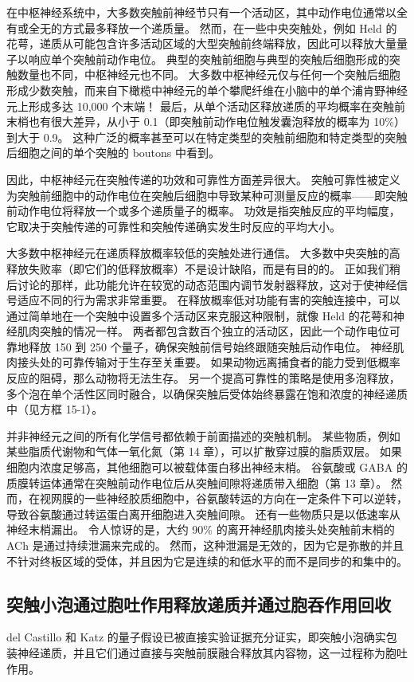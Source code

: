 在中枢神经系统中，大多数突触前神经节只有一个活动区，其中动作电位通常以全有或全无的方式最多释放一个递质量。 然而，在一些中央突触处，例如 Held 的花萼，递质从可能包含许多活动区域的大型突触前终端释放，因此可以释放大量量子以响应单个突触前动作电位。 典型的突触前细胞与典型的突触后细胞形成的突触数量也不同，中枢神经元也不同。 大多数中枢神经元仅与任何一个突触后细胞形成少数突触，而来自下橄榄中神经元的单个攀爬纤维在小脑中的单个浦肯野神经元上形成多达 10,000 个末端！ 最后，从单个活动区释放递质的平均概率在突触前末梢也有很大差异，从小于 0.1（即突触前动作电位触发囊泡释放的概率为 10\%）到大于 0.9。 这种广泛的概率甚至可以在特定类型的突触前细胞和特定类型的突触后细胞之间的单个突触的 boutons 中看到。

因此，中枢神经元在突触传递的功效和可靠性方面差异很大。 突触可靠性被定义为突触前细胞中的动作电位在突触后细胞中导致某种可测量反应的概率——即突触前动作电位将释放一个或多个递质量子的概率。 功效是指突触反应的平均幅度，它取决于突触传递的可靠性和突触传递确实发生时反应的平均大小。

大多数中枢神经元在递质释放概率较低的突触处进行通信。 大多数中央突触的高释放失败率（即它们的低释放概率）不是设计缺陷，而是有目的的。 正如我们稍后讨论的那样，此功能允许在较宽的动态范围内调节发射器释放，这对于使神经信号适应不同的行为需求非常重要。 在释放概率低对功能有害的突触连接中，可以通过简单地在一个突触中设置多个活动区来克服这种限制，就像 Held 的花萼和神经肌肉突触的情况一样。 两者都包含数百个独立的活动区，因此一个动作电位可靠地释放 150 到 250 个量子，确保突触前信号始终跟随突触后动作电位。 神经肌肉接头处的可靠传输对于生存至关重要。 如果动物远离捕食者的能力受到低概率反应的阻碍，那么动物将无法生存。 另一个提高可靠性的策略是使用多泡释放，多个泡在单个活性区同时融合，以确保突触后受体始终暴露在饱和浓度的神经递质中（见方框 15-1）。

并非神经元之间的所有化学信号都依赖于前面描述的突触机制。 某些物质，例如某些脂质代谢物和气体一氧化氮（第 14 章），可以扩散穿过膜的脂质双层。 如果细胞内浓度足够高，其他细胞可以被载体蛋白移出神经末梢。 谷氨酸或 GABA 的质膜转运体通常在突触前动作电位后从突触间隙将递质带入细胞（第 13 章）。 然而，在视网膜的一些神经胶质细胞中，谷氨酸转运的方向在一定条件下可以逆转，导致谷氨酸通过转运蛋白离开细胞进入突触间隙。 还有一些物质只是以低速率从神经末梢漏出。 令人惊讶的是，大约 90\% 的离开神经肌肉接头处突触前末梢的 ACh 是通过持续泄漏来完成的。 然而，这种泄漏是无效的，因为它是弥散的并且不针对终板区域的受体，并且因为它是连续的和低水平的而不是同步的和集中的。


\subsection{突触小泡通过胞吐作用释放递质并通过胞吞作用回收}
del Castillo 和 Katz 的量子假设已被直接实验证据充分证实，即突触小泡确实包装神经递质，并且它们通过直接与突触前膜融合释放其内容物，这一过程称为胞吐作用。

